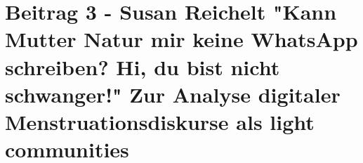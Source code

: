 \section*{Beitrag 3 - Susan Reichelt
"Kann Mutter Natur mir keine WhatsApp schreiben? Hi, du bist nicht schwanger!" Zur Analyse digitaler Menstruationsdiskurse als light communities}